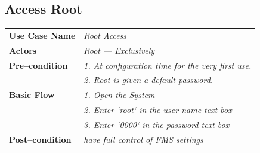 \documentclass{article}
\begin{document}
\subsection{Access Root}
    \begin{tabular}{ l | l }
    \toprule
      \rowcolor{LightCyan}
      \textbf{Use Case Name}    & \textit{Root Access}\\
      \textbf{Actors}           & \textit{Root --- Exclusively}\\
      \rowcolor{LightCyan}
      \textbf{Pre--condition}   & \textit{1. At configuration time for the very first use.} \\
      \rowcolor{LightCyan}
                                & \textit{2. Root is given a default password.}\\
      \textbf{Basic Flow}       & \textit{1. Open the System}\\
                                & \textit{2. Enter `root` in the user name text box}\\
                                & \textit{3. Enter `0000` in the password text box}\\
      \rowcolor{LightCyan}
      \textbf{Post--condition}  & \textit{have full control of FMS settings}\\
    \toprule
    \end{tabular}
    \newpage
\end{document}

